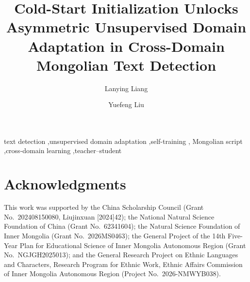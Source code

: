 \documentclass[final,5p,times,twocolumn]{elsarticle}
\begin{document}
\begin{frontmatter}

\title{Cold-Start Initialization Unlocks Asymmetric Unsupervised
       Domain Adaptation in Cross-Domain Mongolian Text Detection}

\author[a]{Lanying Liang}

\author[b]{Yuefeng Liu}





\begin{keyword}
text detection \sep unsupervised domain adaptation \sep self-training \sep
Mongolian script \sep cross-domain learning \sep teacher--student
\end{keyword}

\end{frontmatter}








\section*{Acknowledgments}
This work was supported by the China Scholarship Council
(Grant No.~202408150080, Liujinxuan [2024]42); the National Natural
Science Foundation of China (Grant No.~62341604); the Natural Science
Foundation of Inner Mongolia (Grant No.~2026MS0463); the General
Project of the 14th Five-Year Plan for Educational Science of Inner
Mongolia Autonomous Region (Grant No.~NGJGH2025013); and the General
Research Project on Ethnic Languages and Characters, Research Program
for Ethnic Work, Ethnic Affairs Commission of Inner Mongolia Autonomous
Region (Project No.~2026-NMWYB038).



\end{document}
